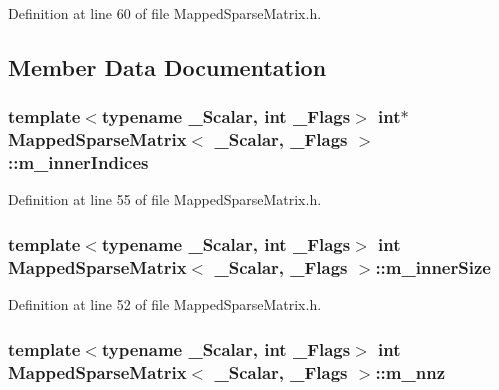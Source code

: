 Definition at line 60 of file Mapped\-Sparse\-Matrix.\-h.



\subsection{Member Data Documentation}
\hypertarget{class_mapped_sparse_matrix_a76219ea52c1e1e70a49b7748081bd57a}{
\subsubsection[{m\-\_\-inner\-Indices}]{\setlength{\rightskip}{0pt plus 5cm}template$<$typename \-\_\-\-Scalar, int \-\_\-\-Flags$>$ {\bf int}$\ast$ {\bf Mapped\-Sparse\-Matrix}$<$ \-\_\-\-Scalar, \-\_\-\-Flags $>$\-::m\-\_\-inner\-Indices}}\label{class_mapped_sparse_matrix_a76219ea52c1e1e70a49b7748081bd57a}


Definition at line 55 of file Mapped\-Sparse\-Matrix.\-h.

\hypertarget{class_mapped_sparse_matrix_ac098d439a21b0fea20d87dca6fa31d0e}{
\subsubsection[{m\-\_\-inner\-Size}]{\setlength{\rightskip}{0pt plus 5cm}template$<$typename \-\_\-\-Scalar, int \-\_\-\-Flags$>$ {\bf int} {\bf Mapped\-Sparse\-Matrix}$<$ \-\_\-\-Scalar, \-\_\-\-Flags $>$\-::m\-\_\-inner\-Size}}\label{class_mapped_sparse_matrix_ac098d439a21b0fea20d87dca6fa31d0e}


Definition at line 52 of file Mapped\-Sparse\-Matrix.\-h.

\hypertarget{class_mapped_sparse_matrix_a53a9c1e78c2cdb8304e3305d4abce668}{
\subsubsection[{m\-\_\-nnz}]{\setlength{\rightskip}{0pt plus 5cm}template$<$typename \-\_\-\-Scalar, int \-\_\-\-Flags$>$ {\bf int} {\bf Mapped\-Sparse\-Matrix}$<$ \-\_\-\-Scalar, \-\_\-\-Flags $>$\-::m\-\_\-nnz}}\label{class_mapped_sparse_matrix_a53a9c1e78c2cdb8304e3305d4abce668}


